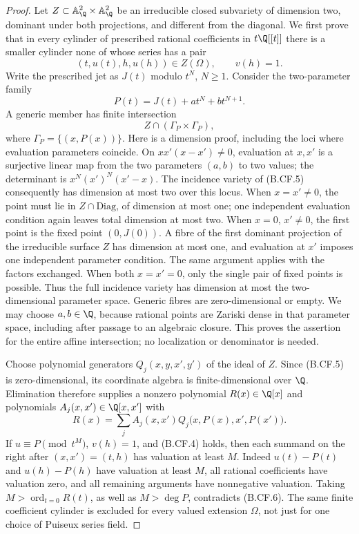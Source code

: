 \begin{proof}
Let \(Z\subset\mathbb A^2_{\Q}\times\mathbb A^2_{\Q}\) be an
irreducible closed subvariety of dimension two, dominant under both
projections, and different from the diagonal. We first prove that
in every cylinder of prescribed rational coefficients in \(t\Q[[t]]\)
there is a smaller cylinder none of whose series has a pair
\[
                 (t,u(t),h,u(h))\in Z(\Omega),\qquad v(h)=1.
                                                        \tag{B.CF.4}
\]
Write the prescribed jet as \(J(t)\) modulo \(t^N\), \(N\geq1\).
Consider the two-parameter family
\[
                       P(t)=J(t)+a t^N+b t^{N+1}.
\]
A generic member has finite intersection
\[
                         Z\cap(\Gamma_P\times\Gamma_P), 
                                                        \tag{B.CF.5}
\]
where \(\Gamma_P=\{(x,P(x))\}\). Here is a dimension proof, including
the loci where evaluation parameters coincide. On
\(xx'(x-x')\ne0\), evaluation at \(x,x'\) is a surjective linear
map from the two parameters \((a,b)\) to two values; the determinant
is \(x^N(x')^N(x'-x)\). The incidence variety of (B.CF.5) consequently
has dimension at most two over this locus. When \(x=x'\ne0\), the
point must lie in \(Z\cap\mathrm{Diag}\), of dimension at most one;
one independent evaluation condition again leaves total dimension at
most two. When \(x=0\), \(x'\ne0\), the first point is the fixed
point \((0,J(0))\). A fibre of the first dominant projection of the
irreducible surface \(Z\) has dimension at most one, and evaluation
at \(x'\) imposes one independent parameter condition. The same
argument applies with the factors exchanged. When both \(x=x'=0\),
only the single pair of fixed points is possible. Thus the full
incidence variety has dimension at most the two-dimensional parameter
space. Generic fibres are zero-dimensional or empty. We may choose
\(a,b\in\Q\), because rational points are Zariski dense in that
parameter space, including after passage to an algebraic closure.
This proves the assertion for the entire affine intersection; no
localization or denominator is needed.

Choose polynomial generators \(Q_j(x,y,x',y')\) of the ideal of
\(Z\). Since (B.CF.5) is zero-dimensional, its coordinate algebra is
finite-dimensional over \(\Q\). Elimination therefore supplies a
nonzero polynomial \(R(x)\in\Q[x]\) and polynomials
\(A_j(x,x')\in\Q[x,x']\) with
\[
 R(x)=\sum_j A_j(x,x')Q_j\bigl(x,P(x),x',P(x')\bigr).
                                                        \tag{B.CF.6}
\]
If \(u\equiv P\pmod{t^M}\), \(v(h)=1\), and (B.CF.4) holds,
then each summand on the right after \((x,x')=(t,h)\) has valuation
at least \(M\). Indeed \(u(t)-P(t)\) and \(u(h)-P(h)\) have
valuation at least \(M\), all rational coefficients have valuation
zero, and all remaining arguments have nonnegative valuation.
Taking \(M>\operatorname{ord}_{t=0}R(t)\), as well as
\(M>\deg P\), contradicts (B.CF.6). The same finite coefficient
cylinder is excluded for every valued extension \(\Omega\), not
just for one choice of Puiseux series field.


\end{proof}
